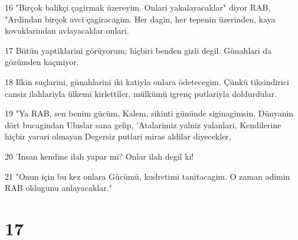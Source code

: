 \par 16 "Birçok balikçi çagirmak üzereyim. Onlari yakalayacaklar" diyor RAB, "Ardindan birçok avci çagiracagim. Her dagin, her tepenin üzerinden, kaya kovuklarindan avlayacaklar onlari.
\par 17 Bütün yaptiklarini görüyorum; hiçbiri benden gizli degil. Günahlari da gözümden kaçmiyor.
\par 18 Ilkin suçlarini, günahlarini iki katiyla onlara ödetecegim. Çünkü tiksindirici cansiz ilahlariyla ülkemi kirlettiler, mülkümü igrenç putlariyla doldurdular.
\par 19 "Ya RAB, sen benim gücüm, Kalem, sikinti gününde siginagimsin. Dünyanin dört bucagindan Uluslar sana gelip, 'Atalarimiz yalniz yalanlari, Kendilerine hiçbir yarari olmayan Degersiz putlari miras aldilar diyecekler,
\par 20 'Insan kendine ilah yapar mi? Onlar ilah degil ki!
\par 21 "Onun için bu kez onlara Gücümü, kudretimi tanitacagim. O zaman adimin RAB oldugunu anlayacaklar."

\chapter{17}

